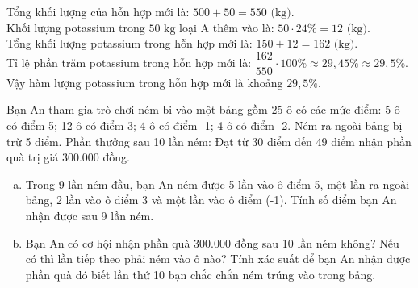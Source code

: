 \begin{bt}
{\begin{enumerate}[a)]
    Tổng khối lượng của hỗn hợp mới là:
    $500 + 50 = 550\text{ (kg)}$.\\
    Khối lượng potassium trong $50\text{ kg}$ loại A thêm vào là:
    $50 \cdot 24\% = 12\text{ (kg)}$.\\
    Tổng khối lượng potassium trong hỗn hợp mới là:
    $150 + 12 = 162\text{ (kg)}$.\\
    Tỉ lệ phần trăm potassium trong hỗn hợp mới là:
    $\dfrac{162}{550} \cdot 100\% \approx 29{,}45\% \approx 29{,}5\%$.\\
    Vậy hàm lượng potassium trong hỗn hợp mới là khoảng $29{,}5\%$.
\end{enumerate}
}
\end{bt}

\begin{bt}%
Bạn An tham gia trò chơi ném bi vào một bảng gồm 25 ô có các mức điểm: 5 ô có điểm 5; 12 ô có điểm 3; 4 ô có điểm -1; 4 ô có điểm -2. Ném ra ngoài bảng bị trừ 5 điểm.
Phần thưởng sau 10 lần ném: Đạt từ 30 điểm đến 49 điểm nhận phần quà trị giá 300.000 đồng.
\begin{enumerate}[a)]
    \item Trong 9 lần ném đầu, bạn An ném được 5 lần vào ô điểm 5, một lần ra ngoài bảng, 2 lần vào ô điểm 3 và một lần vào ô điểm (-1). Tính số điểm bạn An nhận được sau 9 lần ném.
    \item Bạn An có cơ hội nhận phần quà 300.000 đồng sau 10 lần ném không? Nếu có thì lần tiếp theo phải ném vào ô nào? Tính xác suất để bạn An nhận được phần quà đó biết lần thứ 10 bạn chắc chắn ném trúng vào trong bảng.
\end{enumerate}
\end{bt}


